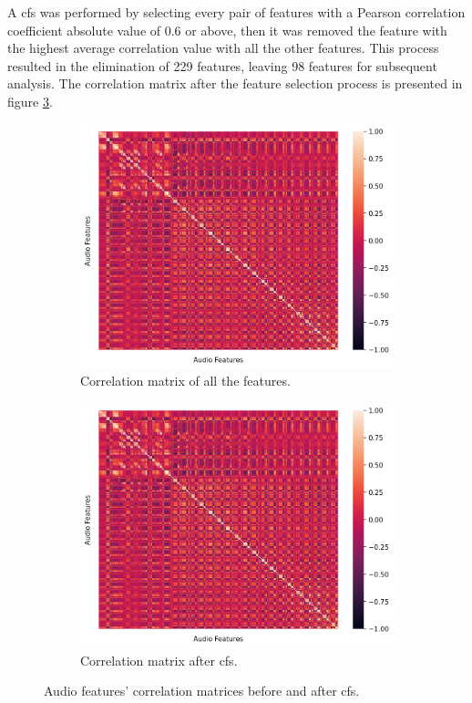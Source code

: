 A \ac{cfs} was performed by selecting every pair of features with a Pearson correlation coefficient absolute value of 0.6 or above, then it was removed the feature with the highest average correlation value with all the other features. This process resulted in the elimination of 229 features, leaving 98 features for subsequent analysis. The correlation matrix after the feature selection process is presented in figure \ref{fig:highAudioFeat}.

\begin{figure}
	\begin{subfigure}{.5\textwidth}
		\centering
		\includegraphics[width=\linewidth]{figs/4_1_traditional/allCorrMatrix.png}
		\caption{Correlation matrix of all the features.}
		\label{fig:allAudioFeat}
	\end{subfigure}%
	\begin{subfigure}{.5\textwidth}
		\centering
		\includegraphics[width=\linewidth]{figs/4_1_traditional/highCorrMatrix.png}
		\caption{Correlation matrix after \ac{cfs}.}
		\label{fig:highAudioFeat}
	\end{subfigure}
	\caption{Audio features' correlation matrices before and after \ac{cfs}.}
\end{figure}



